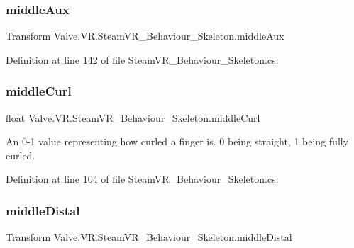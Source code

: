 \subsubsection{\texorpdfstring{middleAux}{middleAux}}
{\footnotesize\ttfamily Transform Valve.\+V\+R.\+Steam\+V\+R\+\_\+\+Behaviour\+\_\+\+Skeleton.\+middle\+Aux\hspace{0.3cm}{\ttfamily [get]}}



Definition at line 142 of file Steam\+V\+R\+\_\+\+Behaviour\+\_\+\+Skeleton.\+cs.

\mbox{\label{class_valve_1_1_v_r_1_1_steam_v_r___behaviour___skeleton_ada685dd77e3fcf0bf21647d898598672}} 
\subsubsection{\texorpdfstring{middleCurl}{middleCurl}}
{\footnotesize\ttfamily float Valve.\+V\+R.\+Steam\+V\+R\+\_\+\+Behaviour\+\_\+\+Skeleton.\+middle\+Curl\hspace{0.3cm}{\ttfamily [get]}}



An 0-\/1 value representing how curled a finger is. 0 being straight, 1 being fully curled. 



Definition at line 104 of file Steam\+V\+R\+\_\+\+Behaviour\+\_\+\+Skeleton.\+cs.

\mbox{\label{class_valve_1_1_v_r_1_1_steam_v_r___behaviour___skeleton_a2bd900f3437ee0cbd496a2e8a1324b64}} 
\subsubsection{\texorpdfstring{middleDistal}{middleDistal}}
{\footnotesize\ttfamily Transform Valve.\+V\+R.\+Steam\+V\+R\+\_\+\+Behaviour\+\_\+\+Skeleton.\+middle\+Distal\hspace{0.3cm}{\ttfamily [get]}}



